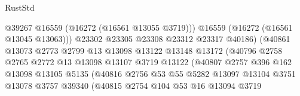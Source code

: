 \begin{lexlean}{RustStd}
\begin{coremodule}
                                          @39267
                                          @16559
                                          (@16272 (@16561 @13055 @3719)))
                                        @16559
                                        (@16272 (@16561 @13045 @13063)))
                                      @23302
                                      @23305
                                      @23308
                                      @23312
                                      @23317
                                      @40186)
                                    (@40861
                                      @13073
                                      @2773
                                      @2799
                                      @13
                                      @13098
                                      @13122
                                      @13148
                                      @13172
                                      (@40796
                                        @2758
                                        @2765
                                        @2772
                                        @13
                                        @13098
                                        @13107
                                        @3719
                                        @13122
                                        (@40807
                                          @2757
                                          @396
                                          @162
                                          @13098
                                          @13105
                                          @5135
                                          (@40816
                                            @2756
                                            @53
                                            @55
                                            @5282
                                            @13097
                                            @13104
                                            @3751
                                            @13078
                                            @3757
                                            @39340
                                            (@40815
                                              @2754
                                              @104
                                              @53
                                              @16
                                              @13094
                                              @3719

\end{coremodule}
\end{lexlean}
